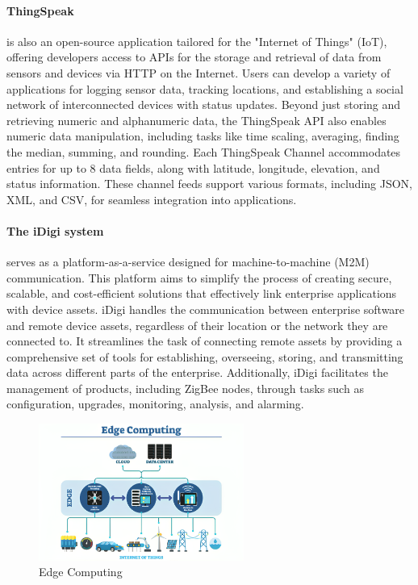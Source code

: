 \documentclass{article}
\begin{document}
\paragraph{ThingSpeak} is also an open-source application tailored for the "Internet of Things" (IoT), offering developers access to APIs for the storage and retrieval of data from sensors and devices via HTTP on the Internet. Users can develop a variety of applications for logging sensor data, tracking locations, and establishing a social network of interconnected devices with status updates. Beyond just storing and retrieving numeric and alphanumeric data, the ThingSpeak API also enables numeric data manipulation, including tasks like time scaling, averaging, finding the median, summing, and rounding. Each ThingSpeak Channel accommodates entries for up to 8 data fields, along with latitude, longitude, elevation, and status information. These channel feeds support various formats, including JSON, XML, and CSV, for seamless integration into applications.

\paragraph{The iDigi system} serves as a platform-as-a-service designed for machine-to-machine (M2M) communication. This platform aims to simplify the process of creating secure, scalable, and cost-efficient solutions that effectively link enterprise applications with device assets. iDigi handles the communication between enterprise software and remote device assets, regardless of their location or the network they are connected to. It streamlines the task of connecting remote assets by providing a comprehensive set of tools for establishing, overseeing, storing, and transmitting data across different parts of the enterprise. Additionally, iDigi facilitates the management of products, including ZigBee nodes, through tasks such as configuration, upgrades, monitoring, analysis, and alarming.

\begin{figure}[H]
\centering
\includegraphics[width=0.6\textwidth]{images/edge.png}
\caption{\label{fig3}Edge Computing}
\end{figure}
\end{document}
